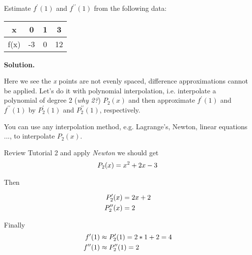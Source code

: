 \begin{exercise}{2} %
Estimate \(f^\prime (1)\) and \(f^{\prime \prime} (1)\) from the following data:

\begin{table}[h]
\centering
\begin{tabular}{|c|c|c|c|}
\hline
x & 0& 1& 3\\ \hline
f(x) & -3 &0 &12 \\ \hline
\end{tabular}
\end{table}

\textbf{Solution.}

Here we see the \textit{x} points are not evenly spaced, difference approximations cannot be applied.
Let's do it with polynomial interpolation, i.e. interpolate a polynomial of degree 2 (\textit{why 2?}) $P_2(x)$ and then approximate  \(f^\prime (1)\) and \(f^{\prime \prime} (1)\) by \(P_2^\prime (1)\) and \(P_2^{\prime \prime} (1)\), respectively.

You can use any interpolation method, e.g. Lagrange's, Newton, linear equations ..., to interpolate $P_2(x)$.

Review Tutorial 2 and apply \textit{Newton} we should get
\begin{align}
P_2(x)= x^2 + 2x -3 \notag
\end{align}

Then

\begin{align}
P^\prime_2(x)&= 2x+2 \notag \\
P^{\prime\prime}_2(x)&= 2 \notag
\end{align}


Finally
\begin{align}
f^\prime(1) &\approx P^\prime_2(1)= 2*1+2 = 4 \notag \\
f^{\prime\prime}(1)& \approx P^{\prime\prime}_2(1)= 2 \notag
\end{align}
\end{exercise}


